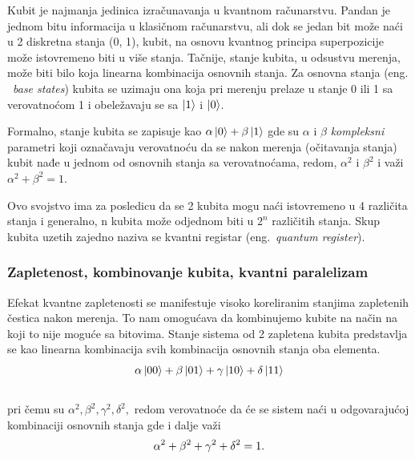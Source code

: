 \documentclass[a4paper]{article}
\begin{document}
{Kubit je najmanja jedinica izračunavanja u kvantnom računarstvu. Pandan je jednom bitu informacija u klasičnom računarstvu, ali dok se jedan bit može naći u 2 diskretna stanja (0, 1),
kubit, na osnovu kvantnog principa superpozicije može istovremeno biti u više stanja.
Tačnije, stanje kubita, u odsustvu merenja, može biti bilo koja linearna kombinacija osnovnih stanja.
Za osnovna stanja (eng. ~\emph{base states}) kubita se uzimaju ona koja pri merenju prelaze u stanje 0 ili 1 sa verovatnoćom 1 i obeležavaju se sa $\ket{1}$ i $\ket{0}$.

Formalno, stanje kubita se zapisuje kao $\alpha \ket{0} + \beta \ket{1}$ gde su $\alpha$ i $\beta$ \emph{kompleksni} parametri koji označavaju verovatnoću da se nakon merenja (očitavanja stanja) kubit nađe u jednom od osnovnih stanja sa verovatnoćama, redom, $\alpha^2$ i $\beta^2$ i važi $\alpha^2+\beta^2=1$.

Ovo svojstvo ima za posledicu da se 2 kubita mogu naći istovremeno u 4 različita stanja i generalno, n kubita može odjednom biti u $2^n$ različitih stanja. Skup kubita uzetih zajedno naziva se kvantni registar (eng.~\emph{quantum register}).

\subsubsection{Zapletenost, kombinovanje kubita, kvantni paralelizam}
\label{entanglement}

Efekat kvantne zapletenosti se manifestuje visoko koreliranim stanjima zapletenih čestica nakon merenja.
To nam omogućava da kombinujemo kubite na način na koji to nije moguće sa bitovima. Stanje sistema od 2 zapletena kubita predstavlja se kao linearna kombinacija svih kombinacija osnovnih stanja oba elementa.\\

\begin{equation*}
\alpha\ket{00} + \beta\ket{01} + \gamma\ket{10} + \delta\ket{11}
\end{equation*}\\

pri čemu su $\alpha^2, \beta^2, \gamma^2, \delta^2,$ redom verovatnoće da će se sistem naći u odgovarajućoj kombinaciji osnovnih stanja gde i dalje važi\\

\begin{equation*}
\alpha^2+\beta^2+\gamma^2+\delta^2=1.\\
\end{equation*}\\

}
\end{document}
